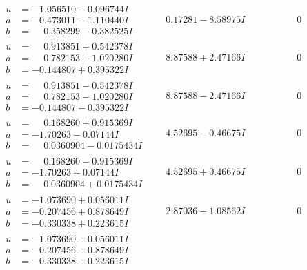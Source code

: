 \documentclass[1p]{elsarticle_modified}
\theoremstyle{definition}
\begin{document}
$$\begin{array}{c|c|c}
\begin{aligned}
u &= -1.056510 - 0.096744 I \\
a &= -0.473011 - 1.110440 I \\
b &= \phantom{-}0.358299 - 0.382525 I\end{aligned}
 & \phantom{-}0.17281 - 8.58975 I & \phantom{-0.000000 } 0 \\ \hline\begin{aligned}
u &= \phantom{-}0.913851 + 0.542378 I \\
a &= \phantom{-}0.782153 + 1.020280 I \\
b &= -0.144807 + 0.395322 I\end{aligned}
 & \phantom{-}8.87588 + 2.47166 I & \phantom{-0.000000 } 0 \\ \hline\begin{aligned}
u &= \phantom{-}0.913851 - 0.542378 I \\
a &= \phantom{-}0.782153 - 1.020280 I \\
b &= -0.144807 - 0.395322 I\end{aligned}
 & \phantom{-}8.87588 - 2.47166 I & \phantom{-0.000000 } 0 \\ \hline\begin{aligned}
u &= \phantom{-}0.168260 + 0.915369 I \\
a &= -1.70263 - 0.07144 I \\
b &= \phantom{-}0.0360904 - 0.0175434 I\end{aligned}
 & \phantom{-}4.52695 - 0.46675 I & \phantom{-0.000000 } 0 \\ \hline\begin{aligned}
u &= \phantom{-}0.168260 - 0.915369 I \\
a &= -1.70263 + 0.07144 I \\
b &= \phantom{-}0.0360904 + 0.0175434 I\end{aligned}
 & \phantom{-}4.52695 + 0.46675 I & \phantom{-0.000000 } 0 \\ \hline\begin{aligned}
u &= -1.073690 + 0.056011 I \\
a &= -0.207456 + 0.878649 I \\
b &= -0.330338 + 0.223615 I\end{aligned}
 & \phantom{-}2.87036 - 1.08562 I & \phantom{-0.000000 } 0 \\ \hline\begin{aligned}
u &= -1.073690 - 0.056011 I \\
a &= -0.207456 - 0.878649 I \\
b &= -0.330338 - 0.223615 I\end{aligned}

\end{array}$$
\end{document}
